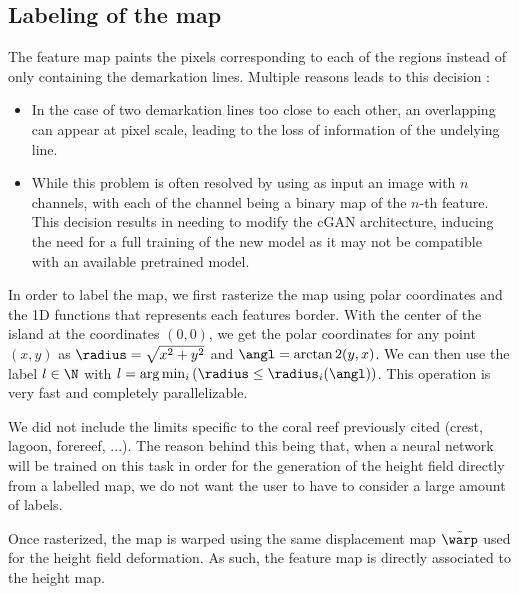 \subsection{Labeling of the map}
The feature map paints the pixels corresponding to each of the regions instead of only containing the demarkation lines. Multiple reasons leads to this decision :
\begin{itemize}
    \item In the case of two demarkation lines too close to each other, an overlapping can appear at pixel scale, leading to the loss of information of the undelying line.
    \item While this problem is often resolved by using as input an image with $n$ channels, with each of the channel being a binary map of the $n$-th feature. This decision results in needing to modify the cGAN architecture, inducing the need for a full training of the new model as it may not be compatible with an available pretrained model.
\end{itemize}

In order to label the map, we first rasterize the map using polar coordinates and the 1D functions that represents each features border. 
With the center of the island at the coordinates $(0, 0)$, we get the polar coordinates for any point $(x, y)$ as $\radius = \sqrt{x^2 + y^2}$ and $\angl = \arctan2 (y, x)$. We can then use the label $l \in \N$ with $l = \arg \min_i \left( \radius \leq \radius_{i}(\angl) \right)$. This operation is very fast and completely parallelizable.

We did not include the limits specific to the coral reef previously cited (crest, lagoon, forereef, ...). The reason behind this being that, when a neural network will be trained on this task in order for the generation of the height field directly from a labelled map, we do not want the user to have to consider a large amount of labels.

Once rasterized, the map is warped using the same displacement map $\Tilde{\warp}$ used for the height field deformation. As such, the feature map is directly associated to the height map.


